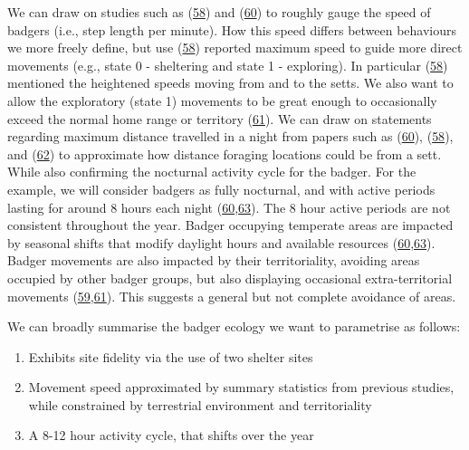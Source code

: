 \documentclass[10pt,a4paper]{article}
\begin{document}
We can draw on studies such as (\protect\hyperlink{ref-kowalczyk_daily_2006}{58}) and (\protect\hyperlink{ref-rosalino_activity_2005}{60}) to roughly gauge the speed of badgers (i.e., step length per minute).
How this speed differs between behaviours we more freely define, but use (\protect\hyperlink{ref-kowalczyk_daily_2006}{58}) reported maximum speed to guide more direct movements (e.g., state 0 - sheltering and state 1 - exploring).
In particular (\protect\hyperlink{ref-kowalczyk_daily_2006}{58}) mentioned the heightened speeds moving from and to the setts.
We also want to allow the exploratory (state 1) movements to be great enough to occasionally exceed the normal home range or territory (\protect\hyperlink{ref-kelly_extra_2020}{61}).
We can draw on statements regarding maximum distance travelled in a night from papers such as (\protect\hyperlink{ref-rosalino_activity_2005}{60}), (\protect\hyperlink{ref-kowalczyk_daily_2006}{58}), and (\protect\hyperlink{ref-loureiro_path_2007}{62}) to approximate how distance foraging locations could be from a sett.
While also confirming the nocturnal activity cycle for the badger.
For the example, we will consider badgers as fully nocturnal, and with active periods lasting for around 8 hours each night (\protect\hyperlink{ref-rosalino_activity_2005}{60},\protect\hyperlink{ref-magowan_dead-reckoning_2022}{63}).
The 8 hour active periods are not consistent throughout the year.
Badger occupying temperate areas are impacted by seasonal shifts that modify daylight hours and available resources (\protect\hyperlink{ref-rosalino_activity_2005}{60},\protect\hyperlink{ref-magowan_dead-reckoning_2022}{63}).
Badger movements are also impacted by their territoriality, avoiding areas occupied by other badger groups, but also displaying occasional extra-territorial movements (\protect\hyperlink{ref-feore_habitat_1999}{59},\protect\hyperlink{ref-kelly_extra_2020}{61}).
This suggests a general but not complete avoidance of areas.

We can broadly summarise the badger ecology we want to parametrise as follows:

\begin{enumerate}
\def\labelenumi{\arabic{enumi}.}
\item
  Exhibits site fidelity via the use of two shelter sites
\item
  Movement speed approximated by summary statistics from previous studies, while constrained by terrestrial environment and territoriality
\item
  A 8-12 hour activity cycle, that shifts over the year
\end{enumerate}
\end{document}
